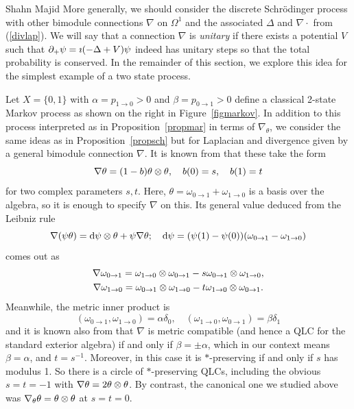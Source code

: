\begin{artengenv}{Shahn Majid}
More generally, we should consider the discrete Schr\"odinger process with other bimodule connections $\nabla$ on $\Omega^1$ and the associated $\Delta$ and $\nabla\cdot$ from (\ref{divlap}). We will say that a connection $\nabla$ is {\em unitary} if there exists a potential $V$ such that ${\partial}_+\psi =\imath(-\Delta+V)\psi$ indeed has unitary steps so that the total probability is conserved. In the remainder of this section, we explore this idea for the simplest example of a two state process. 

\begin{example} Let $X=\{0,1\}$ with $\alpha=p_{1\to 0}>0$ and $\beta=p_{0\to 1}>0$ define a classical 2-state Markov process as shown on the right in Figure~\ref{figmarkov}. In addition to this process interpreted as in Proposition~\ref{propmar} in terms of $\nabla_\theta$, we consider the same ideas as in Proposition~\ref{propsch} but for Laplacian and divergence given by a general bimodule connection $\nabla$. It is known from \parencite[Lemma~2.1]{Ma:squ} that these take the form
\[ \nabla\theta= (1-b)\theta\otimes\theta,\quad b(0)=s,\quad b(1)=t\]
for two complex parameters $s,t$. Here, $\theta= \omega_{0\to 1}+\omega_{1\to 0}$ is a basis over the algebra, so it is enough to specify $\nabla$ on this. Its general value deduced from the Leibniz rule
\[ \nabla(\psi\theta)={\rm d} \psi\otimes\theta+\psi\nabla\theta;\quad {\rm d} \psi=(\psi(1)-\psi(0))(\omega_{0\to 1}-\omega_{1\to 0})\]
comes out as
\begin{equation}
\begin{gathered}
\label{nablas} \nabla\omega_{0\to 1}=\omega_{1\to 0}\tens\omega_{0\to 1}-s\omega_{0\to 1}\tens\omega_{1\to 0},\\
\nabla\omega_{1\to 0}=\omega_{0\to 1}\tens\omega_{1\to 0}-t\omega_{1\to 0}\tens\omega_{0\to 1}.
\end{gathered}
\end{equation}
Meanwhile, the metric inner product is
\[ (\omega_{0\to 1},\omega_{1\to 0})=\alpha\delta_0,\quad (\omega_{1\to 0},\omega_{0\to 1})=\beta\delta_1\]
and it is known also from \parencite[Lemma~2.1]{Ma:squ} that $\nabla$ is metric compatible (and hence a QLC for the standard exterior algebra) if and only if $\beta=\pm\alpha$, which in our context means $\beta=\alpha$, and $t=s^{-1}$. Moreover, in this case it is $*$-preserving if and only if $s$ has modulus 1. So there is a circle of $*$-preserving QLCs, including the obvious $s=t=-1$ with $\nabla\theta=2\theta\otimes\theta$. By contrast, the canonical one we studied above was $\nabla_\theta \theta=\theta\otimes\theta$ at $s=t=0$. 


\end{example}
\end{artengenv}
